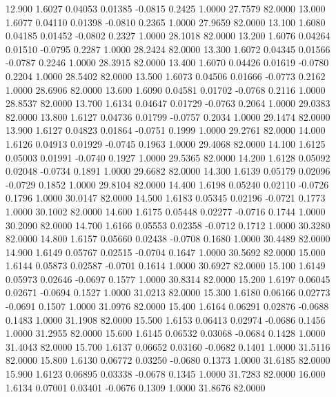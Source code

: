   12.900   1.6027   0.04053   0.01385  -0.0815   0.2425   1.0000  27.7579  82.0000
  13.000   1.6077   0.04110   0.01398  -0.0810   0.2365   1.0000  27.9659  82.0000
  13.100   1.6080   0.04185   0.01452  -0.0802   0.2327   1.0000  28.1018  82.0000
  13.200   1.6076   0.04264   0.01510  -0.0795   0.2287   1.0000  28.2424  82.0000
  13.300   1.6072   0.04345   0.01566  -0.0787   0.2246   1.0000  28.3915  82.0000
  13.400   1.6070   0.04426   0.01619  -0.0780   0.2204   1.0000  28.5402  82.0000
  13.500   1.6073   0.04506   0.01666  -0.0773   0.2162   1.0000  28.6906  82.0000
  13.600   1.6090   0.04581   0.01702  -0.0768   0.2116   1.0000  28.8537  82.0000
  13.700   1.6134   0.04647   0.01729  -0.0763   0.2064   1.0000  29.0383  82.0000
  13.800   1.6127   0.04736   0.01799  -0.0757   0.2034   1.0000  29.1474  82.0000
  13.900   1.6127   0.04823   0.01864  -0.0751   0.1999   1.0000  29.2761  82.0000
  14.000   1.6126   0.04913   0.01929  -0.0745   0.1963   1.0000  29.4068  82.0000
  14.100   1.6125   0.05003   0.01991  -0.0740   0.1927   1.0000  29.5365  82.0000
  14.200   1.6128   0.05092   0.02048  -0.0734   0.1891   1.0000  29.6682  82.0000
  14.300   1.6139   0.05179   0.02096  -0.0729   0.1852   1.0000  29.8104  82.0000
  14.400   1.6198   0.05240   0.02110  -0.0726   0.1796   1.0000  30.0147  82.0000
  14.500   1.6183   0.05345   0.02196  -0.0721   0.1773   1.0000  30.1002  82.0000
  14.600   1.6175   0.05448   0.02277  -0.0716   0.1744   1.0000  30.2090  82.0000
  14.700   1.6166   0.05553   0.02358  -0.0712   0.1712   1.0000  30.3280  82.0000
  14.800   1.6157   0.05660   0.02438  -0.0708   0.1680   1.0000  30.4489  82.0000
  14.900   1.6149   0.05767   0.02515  -0.0704   0.1647   1.0000  30.5692  82.0000
  15.000   1.6144   0.05873   0.02587  -0.0701   0.1614   1.0000  30.6927  82.0000
  15.100   1.6149   0.05973   0.02646  -0.0697   0.1577   1.0000  30.8314  82.0000
  15.200   1.6197   0.06045   0.02671  -0.0694   0.1527   1.0000  31.0213  82.0000
  15.300   1.6180   0.06166   0.02773  -0.0691   0.1507   1.0000  31.0976  82.0000
  15.400   1.6164   0.06291   0.02876  -0.0688   0.1483   1.0000  31.1908  82.0000
  15.500   1.6153   0.06413   0.02974  -0.0686   0.1456   1.0000  31.2955  82.0000
  15.600   1.6145   0.06532   0.03068  -0.0684   0.1428   1.0000  31.4043  82.0000
  15.700   1.6137   0.06652   0.03160  -0.0682   0.1401   1.0000  31.5116  82.0000
  15.800   1.6130   0.06772   0.03250  -0.0680   0.1373   1.0000  31.6185  82.0000
  15.900   1.6123   0.06895   0.03338  -0.0678   0.1345   1.0000  31.7283  82.0000
  16.000   1.6134   0.07001   0.03401  -0.0676   0.1309   1.0000  31.8676  82.0000
